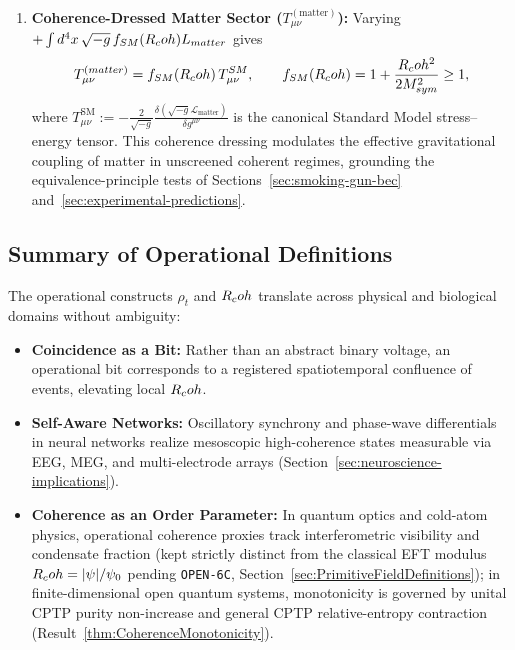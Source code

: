 \begin{enumerate}[leftmargin=2em]
  yielding $T_{00}^{(\mathrm{pot})} = +V_{\mathrm{tot}}(\rho_t, |\psi|) \ge 0$ in $(-,+,+,+)$ and vanishing identically at the equilibrium vacuum $(\rho_0, v_0)$.
  \item \textbf{Coherence-Dressed Matter Sector ($T_{\mu\nu}^{(\mathrm{matter})}$):} Varying $+\int d^4x\,\sqrt{-g}\,f_{SM}(R_coh)L_{matter}$ gives
  \begin{equation}
  T_{\mu\nu}^{(matter)}
  = f_{SM}(R_coh)\,T_{\mu\nu}^{SM},
  \qquad
  f_{SM}(R_coh) = 1 + \frac{R_coh^2}{2 M_{sym}^2} \ge 1,
  \label{eq:T_matt_sec4}
  \end{equation}
  where $T_{\mu\nu}^{\mathrm{SM}} := -\frac{2}{\sqrt{-g}}\frac{\delta(\sqrt{-g}\mathcal{L}_{\mathrm{matter}})}{\delta g^{\mu\nu}}$ is the canonical Standard Model stress--energy tensor. This coherence dressing modulates the effective gravitational coupling of matter in unscreened coherent regimes, grounding the equivalence-principle tests of Sections~\ref{sec:smoking-gun-bec} and~\ref{sec:experimental-predictions}.
\end{enumerate}

\subsection{Summary of Operational Definitions}

The operational constructs $\rho_t$ and $R_coh$ translate across physical and biological domains without ambiguity:
\begin{itemize}
  \item \textbf{Coincidence as a Bit:} Rather than an abstract binary voltage, an operational bit corresponds to a registered spatiotemporal confluence of events, elevating local $R_coh$.
  \item \textbf{Self-Aware Networks:} Oscillatory synchrony and phase-wave differentials in neural networks realize mesoscopic high-coherence states measurable via EEG, MEG, and multi-electrode arrays (Section~\ref{sec:neuroscience-implications}).
  \item \textbf{Coherence as an Order Parameter:} In quantum optics and cold-atom physics, operational coherence proxies track interferometric visibility and condensate fraction (kept strictly distinct from the classical EFT modulus $R_coh = |\psi|/\psi_0$ pending \texttt{OPEN-6C}, Section~\ref{sec:PrimitiveFieldDefinitions}); in finite-dimensional open quantum systems, monotonicity is governed by unital CPTP purity non-increase and general CPTP relative-entropy contraction (Result~\ref{thm:CoherenceMonotonicity}).
\end{itemize}


